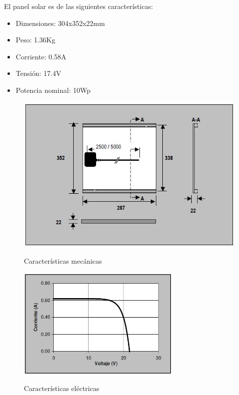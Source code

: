 \noindent El panel solar es de las siguientes características:
\begin{itemize}
\item Dimensiones: 304x352x22mm
\item Peso: 1.36Kg
\item Corriente: 0.58A
\item Tensión: 17.4V
\item Potencia nominal: 10Wp
\end{itemize}

\begin{figure}[h!]
	\centering
    \includegraphics[width=1\textwidth]{./Figures/mecanicas.JPG}
	\label{fig:GANTT2}
	\caption{Características mecánicas}
\end{figure}

\begin{figure}[h!]
	\centering
    \includegraphics[width=0.7\textwidth]{./Figures/curva.JPG}
	\label{fig:GANTT3}
	\caption{Características eléctricas}
\end{figure}
